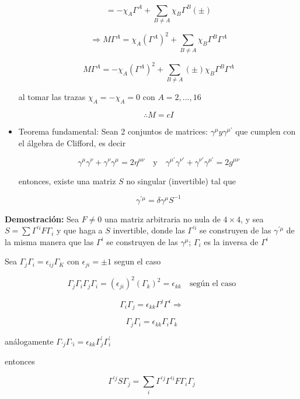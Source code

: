 \documentclass{report}
\begin{document}
\begin{itemize}
\[= - \chi _{A} \Gamma ^{A} + \sum _{B \neq A} \chi _{B} \Gamma ^{B} (\pm )\]

\[\Rightarrow M \Gamma^A = \chi _{A} (\Gamma^A)^2 + \sum_{B \neq A} \chi_{B} \Gamma^B \Gamma^A \]

\[M \Gamma^A = - \chi _{A} (\Gamma^A)^2 + \sum_{B \neq A} (\pm) \chi_{B} \Gamma^B \Gamma^A \]

al tomar las trazas $\chi_{A} = - \chi _{A} = 0$ con $A = 2,...,16$

\[\therefore M = c I\]

\item Teorema fundamental: Sean 2 conjuntos de matrices: $\gamma^{\mu} y \gamma^{\mu \prime}$ que cumplen con el álgebra de Clifford, es decir

\[\gamma^{\mu} \gamma^{\nu} + \gamma^{\nu} \gamma^{\mu} = 2 \eta^{\mu\nu} \quad \text{y} \quad \gamma^{\mu \prime} \gamma^{\nu \prime} + \gamma^{\nu \prime} \gamma^{\mu \prime} = 2 g^{\mu\nu}\]

entonces, existe una matriz $S$ no singular (invertible) tal que

\begin{equation}
\gamma^{\prime \mu} = \delta \gamma^{\mu} S^{-1}
\end{equation}

\end{itemize}

\textbf{Demostración:} Sea $F \neq 0$ una matriz arbitraria no nula de $4 \times 4$, y sea $S = \sum \Gamma^ {\prime i} F \Gamma_{i}$ y que haga a $S$ invertible, donde las $\Gamma^{\prime i}$ se construyen de las $\gamma^{\prime \mu}$ de la misma manera que las $\Gamma^i$ se construyen de las $\gamma^{\mu}$; $\Gamma_{i}$ es la inversa de $\Gamma^i$ 

Sea $\Gamma_{j} \Gamma_{i} = \epsilon_{ij} \Gamma_{K}$ con $\epsilon_{ji} = \pm 1$ segun el caso

\[\Gamma_{j} \Gamma_{i} \Gamma_{j} \Gamma_{i} = (\epsilon_{ji})^2 (\Gamma_{k})^2 = \epsilon_{kk} \quad \text{según el caso}\]

\[\Gamma_{i} \Gamma_{j} = \epsilon_{kk} \Gamma^{j} \Gamma^{i} \Rightarrow\]

\[\Gamma_{j} \Gamma_{i} = \epsilon_{kk} \Gamma_{i} \Gamma_{k}\]

análogamente $\Gamma_{\prime j} \Gamma_{\prime i} = \epsilon_{kk} \Gamma_{j}^{\prime} \Gamma_{i}^{\prime}$

entonces 

\[\Gamma ^{'j} S \Gamma_{j} = \sum_{i} \Gamma^{\prime j} \Gamma ^{\prime i} F \Gamma_{i} \Gamma _{j}\]
\end{document}
